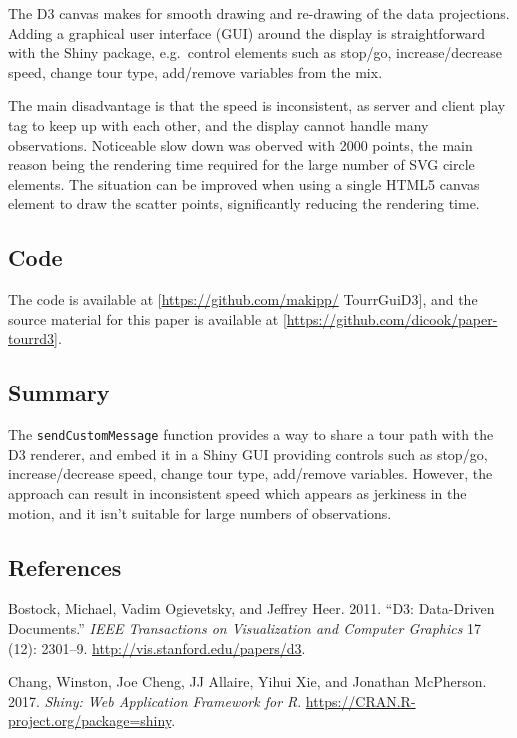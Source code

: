 The D3 canvas makes for smooth drawing and re-drawing of the data
projections. Adding a graphical user interface (GUI) around the display
is straightforward with the Shiny package, e.g.~control elements such as
stop/go, increase/decrease speed, change tour type, add/remove variables
from the mix.

The main disadvantage is that the speed is inconsistent, as server and
client play tag to keep up with each other, and the display cannot
handle many observations. Noticeable slow down was oberved with 2000
points, the main reason being the rendering time required for the large
number of SVG circle elements. The situation can be improved when using
a single HTML5 canvas element to draw the scatter points, significantly
reducing the rendering time.

\subsection{Code}\label{code}

The code is available at {[}\url{https://github.com/makipp/}
TourrGuiD3{]}, and the source material for this paper is available at
{[}\url{https://github.com/dicook/paper-tourrd3}{]}.

\subsection{Summary}\label{summary}

The \texttt{sendCustomMessage} function provides a way to share a tour
path with the D3 renderer, and embed it in a Shiny GUI providing
controls such as stop/go, increase/decrease speed, change tour type,
add/remove variables. However, the approach can result in inconsistent
speed which appears as jerkiness in the motion, and it isn't suitable
for large numbers of observations.

\subsection{References}\label{references}


Bostock, Michael, Vadim Ogievetsky, and Jeffrey Heer. 2011. ``D3:
Data-Driven Documents.'' \emph{IEEE Transactions on Visualization and
Computer Graphics} 17 (12): 2301--9.
\url{http://vis.stanford.edu/papers/d3}.

Chang, Winston, Joe Cheng, JJ Allaire, Yihui Xie, and Jonathan
McPherson. 2017. \emph{Shiny: Web Application Framework for R}.
\url{https://CRAN.R-project.org/package=shiny}.

